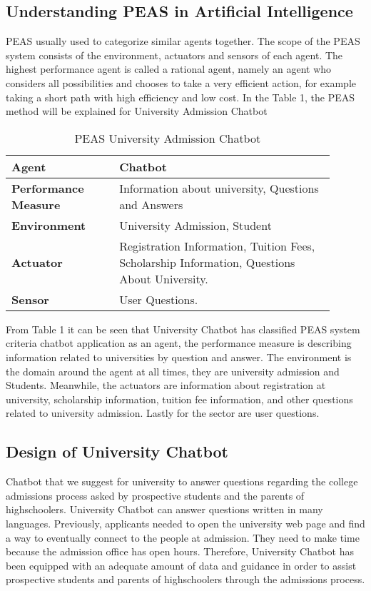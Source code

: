 \documentclass[conference]{IEEEtran}
\begin{document}
\subsection{Understanding PEAS in Artificial Intelligence}
PEAS usually used to categorize similar agents together. The scope of the PEAS system consists of the environment, actuators and sensors of each agent. The highest performance agent is called a rational agent, namely an agent who considers all possibilities and chooses to take a very efficient action, for example taking a short path with high efficiency and low cost. In the Table 1, the PEAS method will be explained for University Admission Chatbot

\begin{table}[ht]
\caption{PEAS University Admission Chatbot}\centering
\begin{tabular}{p{0.30\linewidth}| p{0.6\linewidth}} \hline
\textbf{Agent}&Chatbot \\ \hline
\textbf{Performance Measure}&Information about university, Questions and Answers \\ \hline
\textbf{Environment}&University Admission, Student \\ \hline
\textbf{Actuator}&Registration Information, Tuition Fees, Scholarship Information, Questions About University.\\ \hline
\textbf{Sensor}&User Questions.\\ \hline
\end{tabular}
   \label{tab1}
\end{table}

From Table 1 it can be seen that University Chatbot has classified PEAS system criteria chatbot application as an agent, the performance measure is describing information related to universities by question and answer. The environment is the domain around the agent at all times, they are university admission  and Students. Meanwhile, the actuators are information about registration at university, scholarship information, tuition fee information, and other questions related to university admission. Lastly for the sector are user questions.

\subsection{Design of University Chatbot}
Chatbot that we suggest for university to answer questions regarding the college admissions process asked by prospective students and the parents of highschoolers. University Chatbot can answer questions written in many languages. Previously, applicants needed to open the university web page and find a way to eventually connect to the people at admission. They need to make time because the admission office has open hours. Therefore, University Chatbot has been equipped with an adequate amount of data and guidance in order to assist prospective students and parents of highschoolers through the admissions process.
\end{document}
